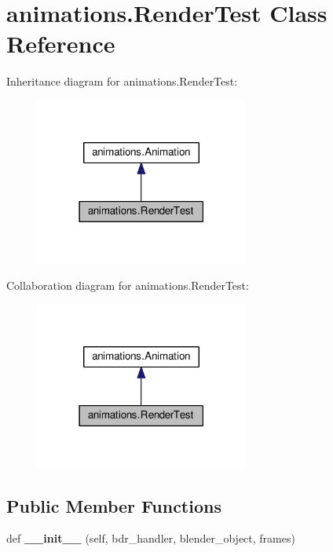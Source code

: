 \hypertarget{classanimations_1_1RenderTest}{}\section{animations.\+Render\+Test Class Reference}
\label{classanimations_1_1RenderTest}


Inheritance diagram for animations.\+Render\+Test\+:\nopagebreak
\begin{figure}[H]
\begin{center}
\leavevmode
\includegraphics[width=198pt]{classanimations_1_1RenderTest__inherit__graph}
\end{center}
\end{figure}


Collaboration diagram for animations.\+Render\+Test\+:\nopagebreak
\begin{figure}[H]
\begin{center}
\leavevmode
\includegraphics[width=198pt]{classanimations_1_1RenderTest__coll__graph}
\end{center}
\end{figure}
\subsection*{Public Member Functions}
\begin{DoxyCompactItemize}
\item 
def {\bfseries \+\_\+\+\_\+init\+\_\+\+\_\+} (self, bdr\+\_\+handler, blender\+\_\+object, frames)\hypertarget{classanimations_1_1RenderTest_a66f89be63f34c2ee2906c0039f2b1035}{}\label{classanimations_1_1RenderTest_a66f89be63f34c2ee2906c0039f2b1035}

\end{DoxyCompactItemize}
